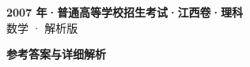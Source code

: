 \documentclass[zihao=-4, a4paper]{ctexart}
\begin{document}
\begin{center}
  {\Large\bfseries 2007 年·普通高等学校招生考试·江西卷·理科}\\[4pt]
  {\large 数学 · 解析版}
\end{center}
\medskip
{}

\clearpage
{}
\begin{center}{\Large\bfseries 参考答案与详细解析}\end{center}
\medskip

\end{document}
